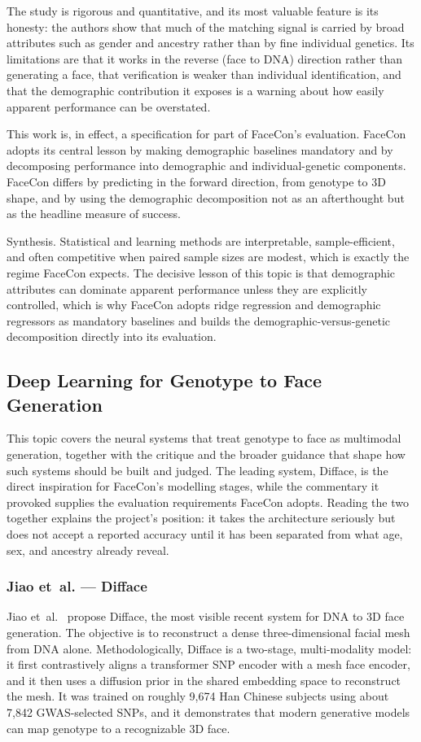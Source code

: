 The study is rigorous and quantitative, and its most valuable feature is its honesty: the authors show that much of the matching signal is carried by broad attributes such as gender and ancestry rather than by fine individual genetics. Its limitations are that it works in the reverse (face to DNA) direction rather than generating a face, that verification is weaker than individual identification, and that the demographic contribution it exposes is a warning about how easily apparent performance can be overstated.

This work is, in effect, a specification for part of FaceCon's evaluation. FaceCon adopts its central lesson by making demographic baselines mandatory and by decomposing performance into demographic and individual-genetic components. FaceCon differs by predicting in the forward direction, from genotype to 3D shape, and by using the demographic decomposition not as an afterthought but as the headline measure of success.

Synthesis. Statistical and learning methods are interpretable, sample-efficient, and often competitive when paired sample sizes are modest, which is exactly the regime FaceCon expects. The decisive lesson of this topic is that demographic attributes can dominate apparent performance unless they are explicitly controlled, which is why FaceCon adopts ridge regression and demographic regressors as mandatory baselines and builds the demographic-versus-genetic decomposition directly into its evaluation.

\subsection{Deep Learning for Genotype to Face Generation}
This topic covers the neural systems that treat genotype to face as multimodal generation, together with the critique and the broader guidance that shape how such systems should be built and judged. The leading system, Difface, is the direct inspiration for FaceCon's modelling stages, while the commentary it provoked supplies the evaluation requirements FaceCon adopts. Reading the two together explains the project's position: it takes the architecture seriously but does not accept a reported accuracy until it has been separated from what age, sex, and ancestry already reveal.

\subsubsection{Jiao et~al. --- Difface}
Jiao et~al.~\cite{ref:difface} propose Difface, the most visible recent system for DNA to 3D face generation. The objective is to reconstruct a dense three-dimensional facial mesh from DNA alone. Methodologically, Difface is a two-stage, multi-modality model: it first contrastively aligns a transformer SNP encoder with a mesh face encoder, and it then uses a diffusion prior in the shared embedding space to reconstruct the mesh. It was trained on roughly 9,674 Han Chinese subjects using about 7,842 GWAS-selected SNPs, and it demonstrates that modern generative models can map genotype to a recognizable 3D face.

